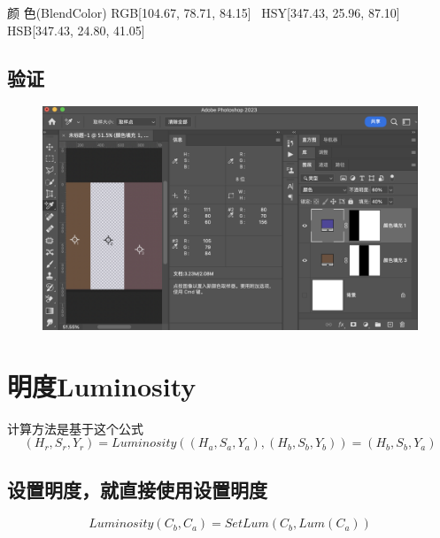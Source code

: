 \begin{result}
\item 颜    色(BlendColor)    RGB[104.67,  78.71,  84.15]~ HSY[347.43,  25.96,  87.10]~ HSB[347.43,  24.80,  41.05]
\end{result}
\newpage
\subsection{ 验证}
\begin{figure}[h!]
	\centering
	\includegraphics[width=\linewidth]{figure/color}
	\caption{}
	\label{fig:color}
\end{figure}



\newpage

\section{ 明度Luminosity}

计算方法是基于这个公式
\begin{equation}(H_r,S_r,Y_r)= Luminosity((H_a,S_a,Y_a),(H_b,S_b,Y_b))=(H_b,S_b,Y_a)\end{equation}

\subsection{ 设置明度，就直接使用设置明度}

\begin{equation}Luminosity(C_b,C_a)=SetLum(C_b,Lum(C_a))\end{equation}

